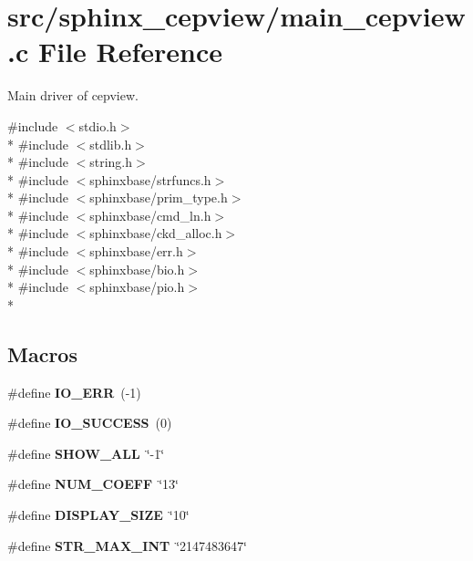 \section{src/sphinx\-\_\-cepview/main\-\_\-cepview.c File Reference}
\label{main__cepview_8c}


Main driver of cepview.  


{\ttfamily \#include $<$stdio.\-h$>$}\\*
{\ttfamily \#include $<$stdlib.\-h$>$}\\*
{\ttfamily \#include $<$string.\-h$>$}\\*
{\ttfamily \#include $<$sphinxbase/strfuncs.\-h$>$}\\*
{\ttfamily \#include $<$sphinxbase/prim\-\_\-type.\-h$>$}\\*
{\ttfamily \#include $<$sphinxbase/cmd\-\_\-ln.\-h$>$}\\*
{\ttfamily \#include $<$sphinxbase/ckd\-\_\-alloc.\-h$>$}\\*
{\ttfamily \#include $<$sphinxbase/err.\-h$>$}\\*
{\ttfamily \#include $<$sphinxbase/bio.\-h$>$}\\*
{\ttfamily \#include $<$sphinxbase/pio.\-h$>$}\\*
\subsection*{Macros}
\begin{DoxyCompactItemize}
\item 
\#define {\bfseries I\-O\-\_\-\-E\-R\-R}~(-\/1)\label{main__cepview_8c_a2f594e19531c324dd254ba0cc712044d}

\item 
\#define {\bfseries I\-O\-\_\-\-S\-U\-C\-C\-E\-S\-S}~(0)\label{main__cepview_8c_adad481c8f8fcb43725ccb11be5c690f4}

\item 
\#define {\bfseries S\-H\-O\-W\-\_\-\-A\-L\-L}~\char`\"{}-\/1\char`\"{}\label{main__cepview_8c_aaddcd19f0e123722b857ec68d1d3e156}

\item 
\#define {\bfseries N\-U\-M\-\_\-\-C\-O\-E\-F\-F}~\char`\"{}13\char`\"{}\label{main__cepview_8c_a56e7544225bcd9da32fa61cde6e6f523}

\item 
\#define {\bfseries D\-I\-S\-P\-L\-A\-Y\-\_\-\-S\-I\-Z\-E}~\char`\"{}10\char`\"{}\label{main__cepview_8c_a035c0b93babde37c8919064af8b67928}

\item 
\#define {\bfseries S\-T\-R\-\_\-\-M\-A\-X\-\_\-\-I\-N\-T}~\char`\"{}2147483647\char`\"{}\label{main__cepview_8c_a01f1f09f8562ef6971aa38c4f8f32954}

\end{DoxyCompactItemize}
